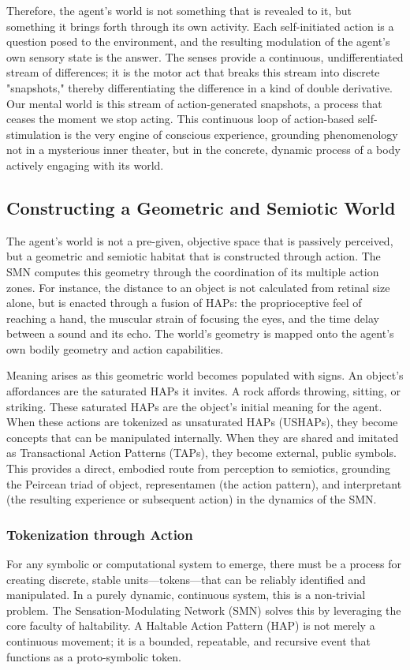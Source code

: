 Therefore, the agent's world is not something that is revealed to it, but something it brings forth through its own activity. Each self-initiated action is a question posed to the environment, and the resulting modulation of the agent's own sensory state is the answer. The senses provide a continuous, undifferentiated stream of differences; it is the motor act that breaks this stream into discrete "snapshots," thereby differentiating the difference in a kind of double derivative. Our mental world is this stream of action-generated snapshots, a process that ceases the moment we stop acting. This continuous loop of action-based self-stimulation is the very engine of conscious experience, grounding phenomenology not in a mysterious inner theater, but in the concrete, dynamic process of a body actively engaging with its world.

\subsection*{Constructing a Geometric and Semiotic World}
The agent's world is not a pre-given, objective space that is passively perceived, but a geometric and semiotic habitat that is constructed through action. The SMN computes this geometry through the coordination of its multiple action zones. For instance, the distance to an object is not calculated from retinal size alone, but is enacted through a fusion of HAPs: the proprioceptive feel of reaching a hand, the muscular strain of focusing the eyes, and the time delay between a sound and its echo. The world's geometry is mapped onto the agent's own bodily geometry and action capabilities.

Meaning arises as this geometric world becomes populated with signs. An object's affordances are the saturated HAPs it invites. A rock affords throwing, sitting, or striking. These saturated HAPs are the object's initial meaning for the agent. When these actions are tokenized as unsaturated HAPs (USHAPs), they become concepts that can be manipulated internally. When they are shared and imitated as Transactional Action Patterns (TAPs), they become external, public symbols. This provides a direct, embodied route from perception to semiotics, grounding the Peircean triad of object, representamen (the action pattern), and interpretant (the resulting experience or subsequent action) in the dynamics of the SMN.

\subsubsection*{Tokenization through Action}
For any symbolic or computational system to emerge, there must be a process for creating discrete, stable units—tokens—that can be reliably identified and manipulated. In a purely dynamic, continuous system, this is a non-trivial problem. The Sensation-Modulating Network (SMN) solves this by leveraging the core faculty of haltability. A Haltable Action Pattern (HAP) is not merely a continuous movement; it is a bounded, repeatable, and recursive event that functions as a proto-symbolic token.

